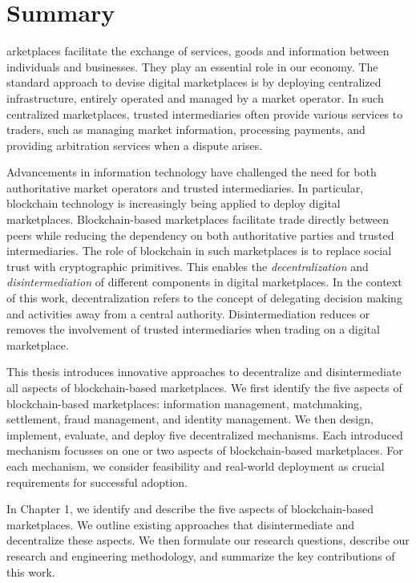 \chapter*{Summary}

arketplaces facilitate the exchange of services, goods and information between individuals and businesses.
They play an essential role in our economy.
The standard approach to devise digital marketplaces is by deploying centralized infrastructure, entirely operated and managed by a market operator.
In such centralized marketplaces, trusted intermediaries often provide various services to traders, such as managing market information, processing payments, and providing arbitration services when a dispute arises.

Advancements in information technology have challenged the need for both authoritative market operators and trusted intermediaries.
In particular, blockchain technology is increasingly being applied to deploy digital marketplaces.
Blockchain-based marketplaces facilitate trade directly between peers while reducing the dependency on both authoritative parties and trusted intermediaries.
The role of blockchain in such marketplaces is to replace social trust with cryptographic primitives.
This enables the \emph{decentralization} and \emph{disintermediation} of different components in digital marketplaces.
In the context of this work, decentralization refers to the concept of delegating decision making and activities away from a central authority.
Disintermediation reduces or removes the involvement of trusted intermediaries when trading on a digital marketplace.

This thesis introduces innovative approaches to decentralize and disintermediate all aspects of blockchain-based marketplaces.
We first identify the five aspects of blockchain-based marketplaces: information management, matchmaking, settlement, fraud management, and identity management.
We then design, implement, evaluate, and deploy five decentralized mechanisms.
Each introduced mechanism focusses on one or two aspects of blockchain-based marketplaces.
For each mechanism, we consider feasibility and real-world deployment as crucial requirements for successful adoption.

In Chapter 1, we identify and describe the five aspects of blockchain-based marketplaces.
We outline existing approaches that disintermediate and decentralize these aspects.
We then formulate our research questions, describe our research and engineering methodology, and summarize the key contributions of this work.

